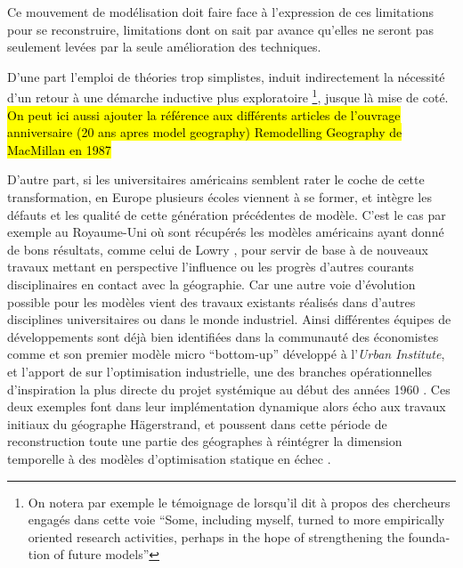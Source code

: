 Ce mouvement de modélisation doit faire face à l'expression de ces limitations pour se reconstruire, limitations dont on sait par avance qu'elles ne seront pas seulement levées par la seule amélioration des techniques.  

D'une part l'emploi de théories trop simplistes, induit indirectement la nécessité d'un retour à une démarche inductive plus exploratoire \footnote{On notera par exemple le témoignage de \textcite{Boyce1988} lorsqu'il dit à propos des chercheurs engagés dans cette voie \foreignquote{english}{Some, including myself, turned to more empirically oriented research activities, perhaps in the hope of strengthening the foundation of future models}}, jusque là mise de coté. \hl{On peut ici aussi ajouter la référence aux différents articles de l'ouvrage anniversaire (20 ans apres model geography) Remodelling Geography de MacMillan en 1987}

D'autre part, si les universitaires américains semblent rater le coche de cette transformation, en Europe plusieurs écoles viennent à se former, et intègre les défauts et les qualité de cette génération précédentes de modèle. C'est le cas par exemple au Royaume-Uni où sont récupérés les modèles américains ayant donné de bons résultats, comme celui de Lowry \autocite{Lowry1964}, pour servir de base à de nouveaux travaux mettant en perspective l'influence ou les progrès d'autres courants disciplinaires en contact avec la géographie. Car une autre voie d'évolution possible pour les modèles vient des travaux existants réalisés dans d'autres disciplines universitaires ou dans le monde industriel. Ainsi différentes équipes de développements sont déjà bien identifiées dans la communauté des économistes comme \textcite{Orcutt1957} et son premier modèle micro \foreignquote{english}{bottom-up} développé à l'\textit{Urban Institute}, et l'apport de \textcite{Forrester1961,Forrester1969} sur l'optimisation industrielle, une des branches opérationnelles d'inspiration la plus directe du projet systémique au début des années 1960 \autocites{Cohen1961}[911]{Shubik1960b}. Ces deux exemples font dans leur implémentation dynamique alors écho aux travaux initiaux du géographe Hägerstrand, et poussent dans cette période de reconstruction toute une partie des géographes à réintégrer la dimension temporelle à des modèles d'optimisation statique en échec \autocite[p295]{Batty1976}.

\pagebreak

